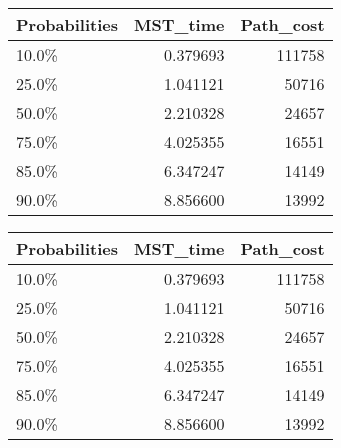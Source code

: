 \begin{tabular}{lrr}
\toprule
Probabilities &  MST\_time &  Path\_cost \\
\midrule
        10.0\% &  0.379693 &     111758 \\
        25.0\% &  1.041121 &      50716 \\
        50.0\% &  2.210328 &      24657 \\
        75.0\% &  4.025355 &      16551 \\
        85.0\% &  6.347247 &      14149 \\
        90.0\% &  8.856600 &      13992 \\
\bottomrule
\end{tabular}
\begin{tabular}{|l|r|r|}
\toprule \hline
Probabilities &  MST\_time &  Path\_cost \\ \hline

\midrule
        10.0\% &  0.379693 &     111758 \\ \hline

        25.0\% &  1.041121 &      50716 \\ \hline

        50.0\% &  2.210328 &      24657 \\ \hline

        75.0\% &  4.025355 &      16551 \\ \hline

        85.0\% &  6.347247 &      14149 \\ \hline

        90.0\% &  8.856600 &      13992 \\ \hline

\bottomrule
\end{tabular}
